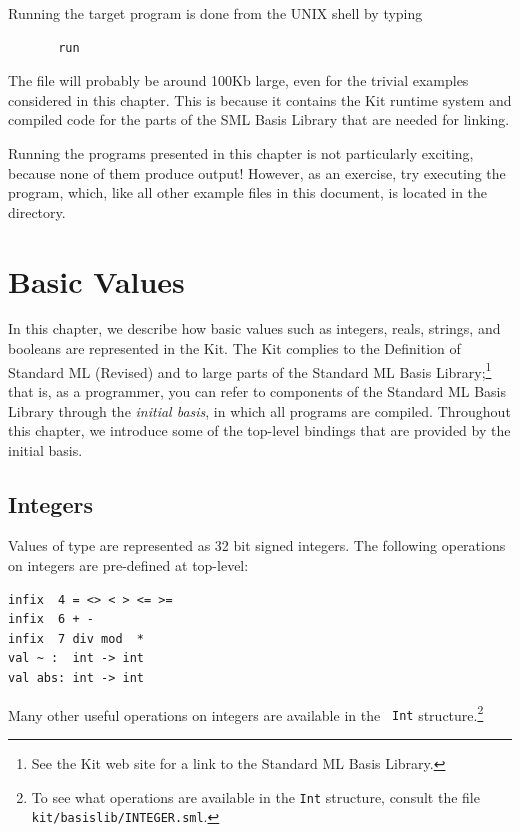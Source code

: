 \documentclass[12pt]{book}
\begin{document}
Running the target program is done from the UNIX shell by typing 
\begin{verbatim}
       run
\end{verbatim}
The file will probably be around 100Kb large, even for the trivial
examples considered in this chapter.  This is because it contains the
Kit runtime system and compiled code for the parts of the SML Basis
Library that are needed for linking.

Running the programs presented in this chapter is not particularly
exciting, because none of them produce output! However, as an
exercise, try executing the  program, which, like all other example files in this
document, is located in the  directory.


\chapter{Basic Values}
In this chapter, we describe how basic values such as integers, reals,
strings, and booleans are represented in the Kit. The Kit complies to
the Definition of Standard ML (Revised) and to large parts of the Standard ML Basis
Library;\footnote{See the Kit web site for a link to the Standard ML
  Basis Library.} that is, as a
programmer, you can refer to components of the Standard ML Basis
Library through the {\em initial basis}, in which all programs are
compiled.  Throughout this chapter, we introduce some of the
top-level bindings that are provided by the initial basis.

\section{Integers}
\label{integers.sec}
Values of type  are represented as 32 bit signed integers.
The following operations on integers are 
pre-defined at top-level:\index{{\tt =}}\index{{\tt <>}}\index{{\tt <}}\index{{\tt >}}\index{{\tt <=}}\index{{\tt >=}}\index{{\tt +}}\index{{\tt -}}\index{{\tt *}}\index{\verb+~+}
\begin{verbatim}
infix  4 = <> < > <= >= 
infix  6 + - 
infix  7 div mod  * 
val ~ :  int -> int
val abs: int -> int
\end{verbatim}
Many other useful operations on integers are available in the {\tt
  Int} structure.\footnote{To see what operations are available in the
  {\tt Int} structure, consult the file {\tt
    kit/basislib/INTEGER.sml}.}
\end{document}
